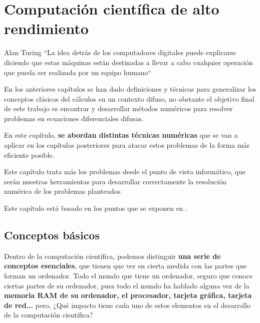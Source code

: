 
\chapter{Computación científica de alto rendimiento}
\begin{chapquote}{Alan Turing}
	``La idea detrás de los computadores digitales puede explicarse diciendo que estas máquinas están destinadas a llevar a cabo cualquier operación que pueda ser realizada por un equipo humano``
\end{chapquote}
En los anteriores capítulos se han dado definiciones y técnicas para generalizar los conceptos clásicos del cálculos en un contexto difuso, no obstante el objetivo final de este trabajo es encontrar y desarrollar métodos numéricos para resolver problemas en ecuaciones diferenciales difusas.

En este capítulo, \textbf{se abordan distintas técnicas numéricas} que se van a aplicar en los capítulos posteriores para atacar estos problemas de la forma más eficiente posible. 

Este capítulo trata más los problemas desde el punto de vista informático, que serán nuestras herramientas para desarrollar correctamente la resolución numérica de los problemas planteados.

Este capítulo está basado en los puntos que se exponen en \cite{paralelo}.

\section{Conceptos básicos}
Dentro de la computación científica, podemos distinguir \textbf{una serie de conceptos esenciales}, que tienen que ver en cierta medida con las partes que forman un ordenador. Todo el mundo que tiene un ordenador, seguro que conoce ciertas partes de su ordenador, pues todo el mundo ha hablado alguna vez de la \textbf{memoria RAM de su ordenador, el procesador, tarjeta gráfica, tarjeta de red...} pero, ¿Qué impacto tiene cada uno de estos elementos en el desarrollo de la computación científica?

